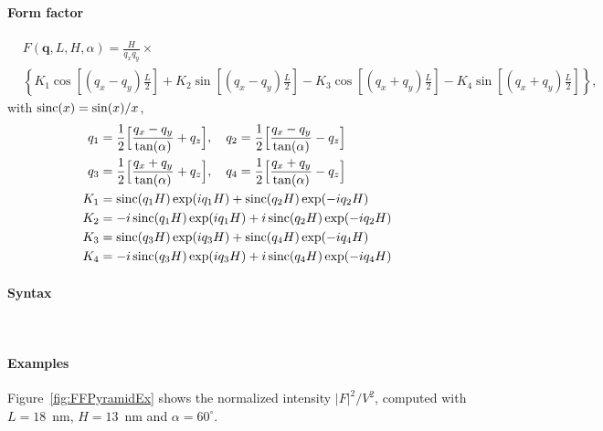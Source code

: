 \paragraph{Form factor}
\begin{align*}
&F(\mathbf{q},L, H, \alpha) =
\frac{H}{q_x q_y} \times \nonumber \\ &\left\{ K_1 \cos\left[
  (q_x-q_y)\frac{L}{2} \right] + K_2 \sin\left[ (q_x-q_y)\frac{L}{2} \right]
- K_3 \cos\left[ (q_x+q_y) \frac{L}{2} \right] - K_4 \sin\left[ (q_x+q_y)\frac{L}{2} \right]\right\},
\end{align*}
with $\operatorname{sinc}(x)=\sin(x)/x$,
\begin{align*}
       q_1 &=\frac{1}{2}\Big[\frac{q_x-q_y}{\tan(\alpha)} + q_z\Big],\quad       q_2 =\frac{1}{2}\Big[\frac{q_x-q_y}{\tan(\alpha)} - q_z\Big]\\
        q_3 &=\frac{1}{2}\Big[\frac{q_x+q_y}{\tan(\alpha)} + q_z\Big],\quad       q_4 =\frac{1}{2}\Big[\frac{q_x+q_y}{\tan(\alpha)} - q_z\Big]\\
        K_1 &= \operatorname{sinc}(q_1 H)\exp(i q_1 H)  + \operatorname{sinc}(q_2 H) \exp(-i q_2 H)\\
        K_2 &= -i \operatorname{sinc}(q_1 H) \exp(i q_1 H) +i \operatorname{sinc}(q_2 H) \exp(-i q_2 H)\\
        K_3 &= \operatorname{sinc}(q_3 H) \exp(i q_3 H)    + \operatorname{sinc}(q_4 H) \exp(-i q_4 H)\\
        K_4 &= -i \operatorname{sinc}(q_3 H) \exp(i q_3 H) + i \operatorname{sinc}(q_4 H) \exp(-i q_4 H) 
   \end{align*}

\paragraph{Syntax}\strut\\

\paragraph{Examples}
Figure~\ref{fig:FFPyramidEx} shows the normalized intensity
$|F|^2/V^2$, computed with $L=18$~nm, $H=13$~nm and
$\alpha=60^{\circ}$.

